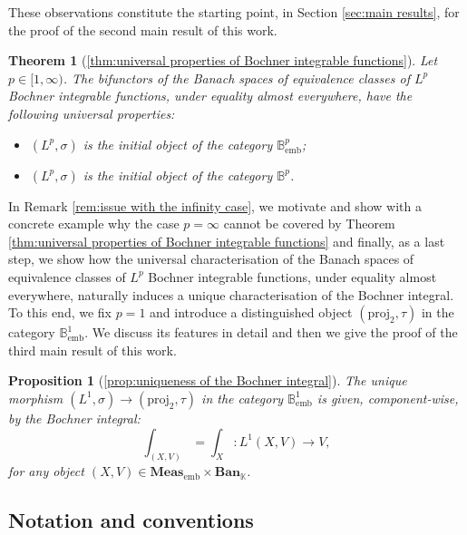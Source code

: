 \documentclass{amsart}
\theoremstyle{definition}
\theoremstyle{plain}
\newtheorem*{theorem*}{Theorem}
\newtheorem*{proposition*}{Proposition}
\newcommand{\embMeas}{\mathbf{Meas}_\mathrm{emb}}
\newcommand{\Ban}{\mathbf{Ban}_{\mathbb{K}}}
\newcommand{\Bembp}{\mathbb{B}_{\mathrm{emb}}^p}
\newcommand{\Bp}{\mathbb{B}^p}
\newcommand{\proj}{\mathrm{proj}_{2}}
\newcommand{\Bemb}{\mathbb{B}_{\mathrm{emb}}^1}
\begin{document}
        These observations constitute the starting point, in Section \ref{sec:main results}, for the proof of the second main result of this work.
        \begin{theorem*}[\ref{thm:universal properties of Bochner integrable functions}]
            Let $p \in [1,\infty)$. The bifunctors of the Banach spaces of equivalence classes of $L^p$ Bochner integrable functions, under equality almost everywhere, have the following universal properties:
            \begin{itemize}
                \item[(i)] $(L^p,\sigma)$ is the initial object of the category $\Bembp$;
                \item[(ii)] $(L^p,\sigma)$ is the initial object of the category $\Bp$.
            \end{itemize} 
        \end{theorem*} 
        In Remark \ref{rem:issue with the infinity case}, we motivate and show with a concrete example why the case $p = \infty$ cannot be covered by Theorem \ref{thm:universal properties of Bochner integrable functions} and finally, as a last step, we show how the universal characterisation of the Banach spaces of equivalence classes of $L^p$ Bochner integrable functions, under equality almost everywhere, naturally induces a unique characterisation of the Bochner integral. \\
        To this end, we fix $p = 1$ and introduce a distinguished object $(\proj,\tau)$ in the category $\Bemb$.
        We discuss its features in detail and then we give the proof of the third main result of this work.
        \begin{proposition*}[\ref{prop:uniqueness of the Bochner integral}]
            The unique morphism $(L^1,\sigma) \rightarrow (\proj,\tau)$ in the category $\Bemb$ is given, component-wise, by the Bochner integral:
            \begin{equation*}
                \int_{(X,V)} = \int_X \colon L^1(X,V) \rightarrow V,
            \end{equation*}
            for any object $(X,V) \in \embMeas \times \Ban$.
        \end{proposition*}


    \subsection{Notation and conventions}
    
\end{document}

